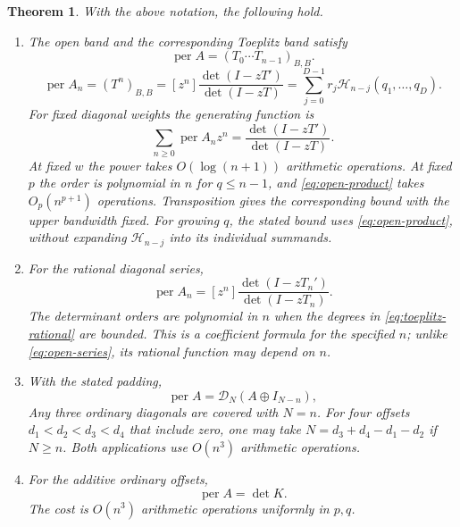 \documentclass[11pt,reqno]{amsart}
\newtheorem{theorem}{Theorem}[section]
\theoremstyle{remark}
\numberwithin{equation}{section}
\newcommand{\per}{\operatorname{per}}
\newcommand{\cH}{\mathcal H}
\begin{document}
\begin{theorem}\label{thm:toeplitz}
With the above notation, the following hold.
\begin{enumerate}
\item The open band and the corresponding Toeplitz band satisfy
\begin{equation}\label{eq:open-product}
 \per A=(T_0\cdots T_{n-1})_{B,B}.
\end{equation}
\begin{equation}\label{eq:open}
 \per A_n=(T^n)_{B,B}
    =[z^n]\frac{\det(I-zT')}{\det(I-zT)}
    =\sum_{j=0}^{D-1}r_j\cH_{n-j}(q_1,\ldots,q_D).
\end{equation}
For fixed diagonal weights the generating function is
\begin{equation}\label{eq:open-series}
 \sum_{n\ge0}\per A_n z^n=\frac{\det(I-zT')}{\det(I-zT)}.
\end{equation}
At fixed \(w\) the power takes \(O(\log(n+1))\) arithmetic
operations. At fixed \(p\) the order is polynomial in \(n\)
for \(q\le n-1\), and \eqref{eq:open-product} takes
\(O_p(n^{p+1})\) operations. Transposition gives the
corresponding bound with the upper bandwidth fixed. For growing
\(q\), the stated bound uses \eqref{eq:open-product}, without
expanding \(\cH_{n-j}\) into its individual summands.

\item For the rational diagonal series,
\begin{equation}\label{eq:rationaltoeplitz}
 \per A_n=[z^n]\frac{\det(I-zT_n')}{\det(I-zT_n)} .
\end{equation}
The determinant orders are polynomial in \(n\) when the degrees
in \eqref{eq:toeplitz-rational} are bounded. This is a coefficient
formula for the specified \(n\); unlike \eqref{eq:open-series},
its rational function may depend on \(n\).

\item With the stated padding,
\begin{equation}\label{eq:open-padding}
 \per A=\mathcal D_N(A\oplus I_{N-n}),
\end{equation}
Any three ordinary diagonals are covered with \(N=n\).
For four offsets \(d_1<d_2<d_3<d_4\) that include zero,
one may take \(N=d_3+d_4-d_1-d_2\) if \(N\ge n\).
Both applications use \(O(n^3)\) arithmetic operations.

\item For the additive ordinary offsets,
\begin{equation}\label{eq:additive-open}
 \per A=\det K.
\end{equation}
The cost is \(O(n^3)\) arithmetic operations uniformly
in \(p,q\).


\end{enumerate}
\end{theorem}
\end{document}
